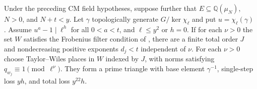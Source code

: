 \begin{theorem}
\label{thm:c-prime-triangle}
\emitthmsource
Under the preceding CM field hypotheses, suppose further that $E\subseteq\mathbb Q(\mu_N)$, $N>0$, and $N+t<y$. Let $\gamma$ topologically generate $G/\ker\chi_\ell$ and put $u=\chi_\ell(\gamma)$. Assume $u^a-1\mid\ell^h$ for all $0<a<t$, and $\ell\le y^2$ or $h=0$. If for each $\nu>0$ the set $W$ satisfies the Frobenius filter condition of , there are a finite total order $J$ and nondecreasing positive exponents $d_j<t$ independent of $\nu$. For each $\nu>0$ choose Taylor--Wiles places in $W$ indexed by $J$, with norms satisfying $q_{w_j}\equiv1\pmod{\ell^\nu}$. They form a prime triangle with base element $\gamma^{-1}$, single-step loss $yh$, and total loss $y^{22}h$.
\end{theorem}
